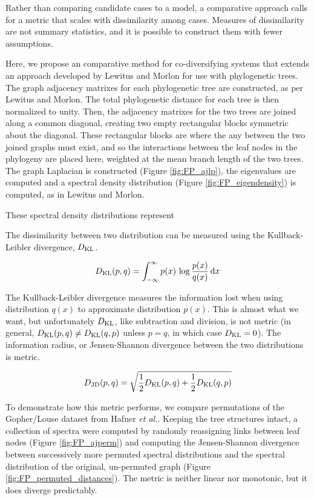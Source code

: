 Rather than comparing candidate cases to a model, a comparative approach calls for a metric that scales with dissimilarity among cases. Measures of dissimilarity are not summary statistics, and it is possible to construct them with fewer assumptions. 



Here, we propose an comparative method for co-diversifying systems that extends an approach developed by Lewitus and Morlon \cite{lewitus2015characterizing} for use with phylogenetic trees. The graph adjacency matrixes for each phylogenetic tree are constructed, as per Lewitus and Morlon. The total phylogenetic distance for each tree is then normalized to unity. Then, the adjacency matrixes for the two trees are joined along a common diagonal, creating two empty rectangular blocks symmetric about the diagonal. These rectangular blocks are where the any between the two joined graphs must exist, and so the interactions between the leaf nodes in the phylogeny are placed here, weighted at the mean branch length of the two trees. The graph Laplacian is constructed (Figure \ref{fig:FP_ajlp}), the eigenvalues are computed and a spectral density distribution (Figure \ref{fig:FP_eigendensity}) is computed, as in Lewitus and Morlon. 



These spectral density distributions represent 

The dissimilarity between two distribution can be measured using the Kullback-Leibler divergence, $D_{\rm KL}$. 

\begin{equation}
    D_{\rm KL}( p, q ) = \int_{-\infty}^\infty p(x) \, \log\frac{p(x)}{q(x)} \, {\rm d}x
\end{equation}

\noindent The Kullback-Leibler divergence measures the information lost when using distribution $q(x)$ to approximate distribution $p(x)$. This is almost what we want, but unfortunately $D_{\rm KL}$, like subtraction and division, is not metric (in general, $D_{\rm KL}(p,q) \neq D_{\rm KL}(q,p)$ unless $p=q$, in which case $D_{\rm KL}=0$). The information radius, or Jensen-Shannon divergence between the two distributions is metric.

\begin{equation}
    D_{\rm JD}( p, q ) = \sqrt{ \frac{1}{2} D_{\rm KL}( p, q ) + \frac{1}{2} D_{\rm KL}( q, p ) }
\end{equation}

\noindent To demonstrate how this metric performs, we compare permutations of the Gopher/Louse dataset from Hafner {\em et al.}. Keeping the tree structures intact, a collection of spectra were computed by randomly reassigning links between leaf nodes (Figure \ref{fig:FP_ajperm}) and computing the Jensen-Shannon divergence between successively more permuted spectral distributions and the spectral distribution of the original, un-permuted graph (Figure \ref{fig:FP_permuted_distances}). The metric is neither linear nor monotonic, but it does diverge predictably. 



